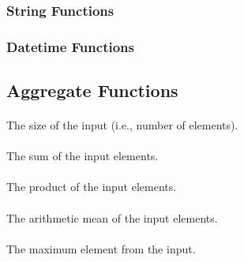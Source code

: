 \subsubsection{String Functions}


\subsubsection{Datetime Functions}


\subsection{Aggregate Functions}

\paragraph{}

The size of the input (i.e., number of elements).

\paragraph{}

The sum of the input elements.

\paragraph{}

The product of the input elements.

\paragraph{}

The arithmetic mean of the input elements.

\paragraph{}

The maximum element from the input.

\paragraph{}

